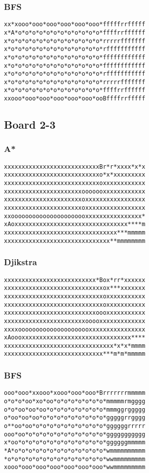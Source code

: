 \documentclass[11pt,a4paper]{article}
\begin{document}
\subsubsection*{BFS}
\begin{lstlisting}
xx*xooo*ooo*ooo*ooo*ooo*ooo*fffffrrfffff
x*A*o*o*o*o*o*o*o*o*o*o*o*o*ffffrrffffff
x*o*o*o*o*o*o*o*o*o*o*o*o*o*rrrrrfffffff
x*o*o*o*o*o*o*o*o*o*o*o*o*o*rfffffffffff
x*o*o*o*o*o*o*o*o*o*o*o*o*o*ffffffffffff
x*o*o*o*o*o*o*o*o*o*o*o*o*o*ffffffffffff
x*o*o*o*o*o*o*o*o*o*o*o*o*o*rfffffffffff
x*o*o*o*o*o*o*o*o*o*o*o*o*o*rrrrrfffffff
x*o*o*o*o*o*o*o*o*o*o*o*o*o*ffffrrffffff
xxooo*ooo*ooo*ooo*ooo*ooo*ooBffffrrfffff
\end{lstlisting}
\subsection*{Board 2-3}
\subsubsection*{A*}
\begin{lstlisting}
xxxxxxxxxxxxxxxxxxxxxxxxxxxBr*r*xxxx*x*x
xxxxxxxxxxxxxxxxxxxxxxxxxxxo*x*xxxxxxxxx
xxxxxxxxxxxxxxxxxxxxxxxxxxxoxxxxxxxxxxxx
xxxxxxxxxxxxxxxxxxxxxxooooooxxxxxxxxxxxx
xxxxxxxxxxxxxxxxxxxxxxoxxxxxxxxxxxxxxxxx
xxxxxxxxxxxxxxxxxxxxxxoxxxxxxxxxxxxxxxxx
xxoooooooooooooooooooooxxxxxxxxxxxxxxxx*
xAoxxxxxxxxxxxxxxxxxxxxxxxxxxxxxxxx****m
xxxxxxxxxxxxxxxxxxxxxxxxxxxxxxxx***mmmmm
xxxxxxxxxxxxxxxxxxxxxxxxxxxxxx**mmmmmmmm
\end{lstlisting}
\subsubsection*{Djikstra}

\begin{lstlisting}
xxxxxxxxxxxxxxxxxxxxxxxxxx*Box*rr*xxxxxx
xxxxxxxxxxxxxxxxxxxxxxxxxxxxox***xxxxxxx
xxxxxxxxxxxxxxxxxxxxxxxxxxxxoxxxxxxxxxxx
xxxxxxxxxxxxxxxxxxxxxxxxxxxxoxxxxxxxxxxx
xxxxxxxxxxxxxxxxxxxxxxxxxxoooxxxxxxxxxxx
xxxxxxxxxxxxxxxxxxxxxxxooooxxxxxxxxxxxxx
xxxxooooooooooooooooooooxxxxxxxxxxxxxxxx
xAoooxxxxxxxxxxxxxxxxxxxxxxxxxxxxxxx****
xxxxxxxxxxxxxxxxxxxxxxxxxxxxxxx*x*x*mmmm
xxxxxxxxxxxxxxxxxxxxxxxxxxxx***m*m*mmmmm
\end{lstlisting}


\subsubsection*{BFS}
\begin{lstlisting}
ooo*ooo*xxooo*xooo*ooo*ooo*Brrrrrrrmmmmm
o*o*o*oo*xo*oo*o*o*o*o*o*o*o*mmmmmrmgggg
o*o*oo*oo*oo*o*o*o*o*o*o*o*o*mmmggrggggg
o*oo*oo*oo*o*o*o*o*o*o*o*o*o*gggggrrgggg
o**oo*oo*o*o*o*o*o*o*o*o*o*o*ggggggrrrrr
ooo*oo*o*o*o*o*o*o*o*o*o*o*o*ggggggggggg
x*oo*o*o*o*o*o*o*o*o*o*o*o*o*ggggggmmmmm
*A*o*o*o*o*o*o*o*o*o*o*o*o*o*wmmmmmmmmmm
*o*o*o*o*o*o*o*o*o*o*o*o*o*o*wwmmmmmmmmm
xooo*ooo*ooo*ooo*ooo*ooo*ooo*wwmmmmmmmmm
\end{lstlisting}
\end{document}
